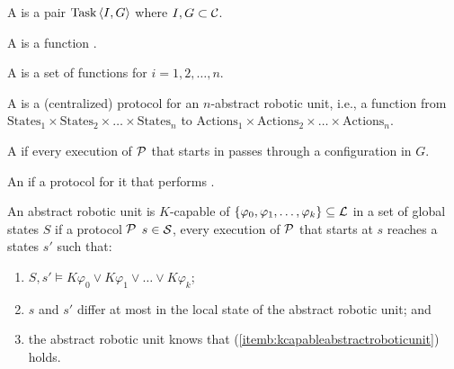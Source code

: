 \begin{defi}[Task]
A  is a pair $\mbox{Task}\left\langle I,G\right\rangle$ where $I,G\subset\mathcal{C}$.
\cite{conf/ijcai/BrafmanS95}
\end{defi}

\begin{defi}
A  is a function .
\cite{conf/ijcai/BrafmanS95}
\end{defi}

\begin{defi}
A  is a set of functions  for $i=1,2,\ldots,n$.
\cite{conf/ijcai/BrafmanS95}
\end{defi}

\begin{defi}
A  is a (centralized) protocol for an $n$-abstract robotic unit, i.e., a function from $\mbox{States}_1\times\mbox{States}_2\times\ldots\times\mbox{States}_n$ to $\mbox{Actions}_1\times\mbox{Actions}_2\times\ldots\times\mbox{Actions}_n$.
\cite{conf/ijcai/BrafmanS95}
\end{defi}

\begin{defi}
A  if every execution of $\mathcal{P}$ that starts in  passes through a configuration in $G$.
\cite{conf/ijcai/BrafmanS95}
\end{defi}

\begin{defi}
An  if \tiTx{} a protocol for it that performs .
\cite{conf/ijcai/BrafmanS95}
\end{defi}

\begin{defi}
An abstract robotic unit is $K$-capable of $\left\{ \varphi_0,\varphi_1,\ldots,\varphi_k\right\}\subseteq\mathcal{L}$ in a set of global states $S$ if \teTx{} a protocol $\mathcal{P}$ \stTx{} \feTx{} $s\in\mathcal{S}$, every execution of $\mathcal{P}$ that starts at $s$ reaches a states $s'$ such that:
\begin{enumerate}
 \item $S,s'\vDash K\varphi_0\vee K\varphi_1\vee\ldots\vee K\varphi_k$;
 \item\label{itemb:kcapableabstractroboticunit} $s$ and $s'$ differ at most in the local state of the abstract robotic unit; and
 \item the abstract robotic unit knows that (\ref{itemb:kcapableabstractroboticunit}) holds.
\end{enumerate}
\cite{conf/ijcai/BrafmanS95}
\end{defi}

